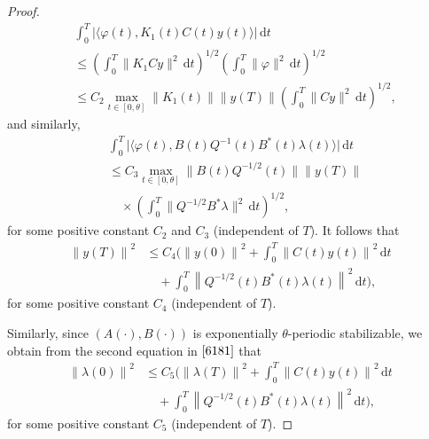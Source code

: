 \documentclass{IEEEtran}
\begin{document}
\begin{proof}
\begin{equation*}
\begin{split}
				&\int_0^T \bigl| \langle \varphi(t), K_1(t)C(t) y(t)\rangle \bigr|\,\mathrm{d}t \\&\leq \left( \int_0^T \| K_1 C y\|^2\,\mathrm{d}t \right)^{1/2} \left( \int_0^T \| \varphi\|^2\,\mathrm{d}t \right)^{1/2} \\
				&\leq C_2 \max_{t \in [0,\theta]} \|K_1(t)\| \|y(T)\| \left( \int_0^T \|C y\|^2\,\mathrm{d}t \right)^{1/2}, 
			\end{split}
		\end{equation*}
		and similarly,
		\begin{equation*}
			\begin{split}
				&\int_0^T \bigl| \langle \varphi(t), B(t)Q^{-1}(t)B^*(t)\lambda(t)\rangle \bigr|\,\mathrm{d}t\\ &\leq C_3 \max_{t \in [0,\theta]} \|B(t)Q^{-1/2}(t)\| \|y(T)\| \\
				&\quad \times \left( \int_0^T \|Q^{-1/2}B^*\lambda\|^2\,\mathrm{d}t \right)^{1/2},
			\end{split}
		\end{equation*}
		for  some positive constant $C_2$ and $C_3$  (independent of $T$). It follows that
		\begin{equation}\label{yT}
			\begin{split}
				\left\|y(T) \right\|^2 
				&\leqslant C_4\Bigg( \left\| y(0) \right\|^2 +\int_0^T \left\| C(t) y(t)\right\|^2 \,\mathrm{d}t\\
				&\quad + \int_0^T\left\|Q^{-1/2}(t)B^*(t)\lambda(t) \right\|^2 \,\mathrm{d}t\Bigg),
			\end{split}
		\end{equation}
		for  some positive constant $C_4$ (independent of $T$).
		
		Similarly, since $(A(\cdot),B(\cdot))$ is exponentially $\theta$-periodic stabilizable, we obtain from the second equation in $\eqref{6181}$ that
		\begin{equation}\label{lambda0}
			\begin{split}
				\left\|\lambda(0) \right\|^2 
				&\leqslant C_5\Bigg( \left\| \lambda(T) \right\|^2 +\int_0^T \left\| C(t) y(t)\right\|^2 \,\mathrm{d}t\\
				&\quad + \int_0^T\left\|Q^{-1/2}(t)B^*(t)\lambda(t) \right\|^2 \,\mathrm{d}t\Bigg),
			\end{split} 
		\end{equation}
		for  some positive constant $C_5$ (independent of $T$).
		

\end{proof}
\end{document}
